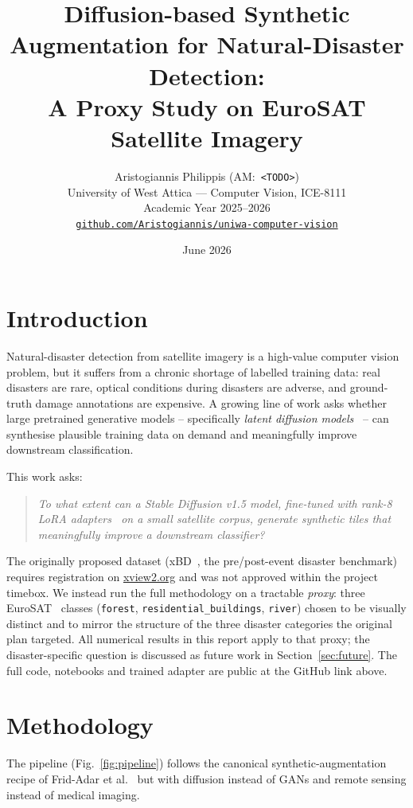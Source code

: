 \documentclass[12pt,a4paper]{article}
\title{\large\bfseries Diffusion-based Synthetic Augmentation for
Natural-Disaster Detection: \\ A Proxy Study on EuroSAT Satellite Imagery}
\author{%
Aristogiannis Philippis (AM:~\texttt{<TODO>}) \\[2pt]
\small University of West Attica --- Computer Vision, ICE-8111 \\
\small Academic Year 2025--2026 \\
\small \href{https://github.com/Aristogiannis/uniwa-computer-vision}{\texttt{github.com/Aristogiannis/uniwa-computer-vision}}}
\date{June 2026}
\begin{document}
\maketitle

\vspace{-1.2em}

\section{Introduction}

Natural-disaster detection from satellite imagery is a high-value computer
vision problem, but it suffers from a chronic shortage of labelled training
data: real disasters are rare, optical conditions during disasters are
adverse, and ground-truth damage annotations are expensive. A growing line
of work asks whether large pretrained generative models -- specifically
\emph{latent diffusion models}~\cite{rombach2022highresolution} -- can
synthesise plausible training data on demand and meaningfully improve
downstream classification.

This work asks:
\begin{quote}
\emph{To what extent can a Stable Diffusion v1.5 model, fine-tuned with
rank-8 LoRA adapters~\cite{hu2021lora} on a small satellite corpus,
generate synthetic tiles that meaningfully improve a downstream
classifier?}
\end{quote}

The originally proposed dataset (xBD~\cite{gupta2019xbd}, the
pre/post-event disaster benchmark) requires registration on
\href{https://xview2.org}{xview2.org} and was not approved within the
project timebox. We instead run the full methodology on a tractable
\emph{proxy}: three EuroSAT~\cite{helber2019eurosat} classes
(\texttt{forest}, \texttt{residential\_buildings}, \texttt{river}) chosen
to be visually distinct and to mirror the structure of the three
disaster categories the original plan targeted. All numerical results in
this report apply to that proxy; the disaster-specific question is
discussed as future work in Section~\ref{sec:future}. The full code,
notebooks and trained adapter are public at the GitHub link above.

\section{Methodology}
\label{sec:method}

The pipeline (Fig.~\ref{fig:pipeline}) follows the canonical
synthetic-augmentation recipe of Frid-Adar et
al.~\cite{fridadar2018gan} but with diffusion instead of GANs and remote
sensing instead of medical imaging.
\end{document}
